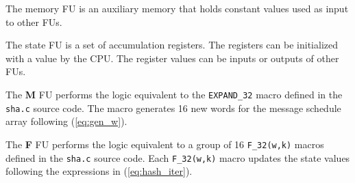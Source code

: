 The memory FU is an auxiliary memory that holds constant values used as input to
other FUs.

The state FU is a set of accumulation registers. The registers can be
initialized with a value by the CPU. The register values can be inputs or
outputs of other FUs.

The \textbf{M} FU performs the logic equivalent to the \texttt{EXPAND\_32}
macro defined in the \texttt{sha.c} source code. The macro generates 16 new
words for the message schedule array following (\ref{eq:gen_w}).

The \textbf{F} FU performs the logic equivalent to a group of 16
\texttt{F\_32(w,k)} macros defined in the \texttt{sha.c} source code.
Each \texttt{F\_32(w,k)} macro updates the state values following the
expressions in (\ref{eq:hash_iter}).
